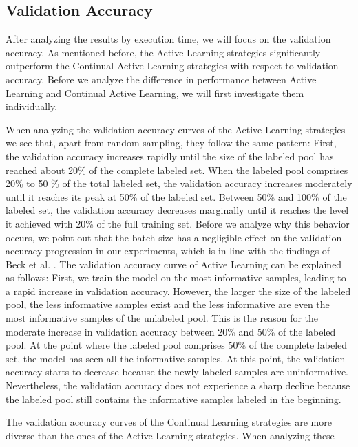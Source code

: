 \subsection{Validation Accuracy}
\label{sec:Discussion:ValidationAccuracy}
After analyzing the results by execution time, we will focus on the validation accuracy. As mentioned before, the Active Learning strategies significantly
outperform the Continual Active Learning strategies with respect to validation accuracy. Before we analyze the difference in performance
between Active Learning and Continual Active Learning, we will first investigate them individually. \par
When analyzing the validation accuracy curves of the Active Learning strategies we see that, apart from random sampling, they follow the same
pattern: First, the validation accuracy increases rapidly until the size of the labeled pool has reached about 20\% of the complete labeled set. When the labeled
pool comprises 20\% to 50 \% of the total labeled set, the validation accuracy increases moderately until it reaches its peak at 50\% of the labeled set. Between
50\% and 100\% of the labeled set, the validation accuracy decreases marginally until it reaches the level it achieved with 20\% of the full training set. Before
we analyze why this behavior occurs, we point out that the batch size has a negligible effect on the validation accuracy progression in our experiments, which
is in line with the findings of Beck et al. \cite{beck2021effective}. The validation accuracy curve of Active Learning can be explained as follows: First, we
train the model on the most informative samples, leading to a rapid increase in validation accuracy. However, the larger the size of the labeled pool, the
less informative samples exist and the less informative are even the most informative samples of the unlabeled pool. This is the reason for the moderate increase
in validation accuracy between 20\% and 50\% of the labeled pool. At the point where the labeled pool comprises 50\% of the complete labeled set, the model has seen
all the informative samples. At this point, the validation accuracy starts to decrease because the newly labeled samples are uninformative. Nevertheless, the validation accuracy
does not experience a sharp decline because the labeled pool still contains the informative samples labeled in the beginning. \par
The validation accuracy curves of the Continual Learning strategies are more diverse than the ones of the Active Learning strategies. When analyzing these
